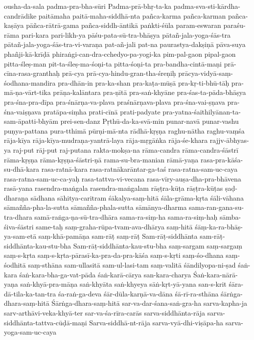 {ousha-da-sala
padma-pra-bha-sūri
Padma-prā-bhṛ-ta-ka
padma-sva-sti-kārdha-candrādike
paitāmaha
paitā-maha-siddhā-nta
pañca-karma
pañca-karman
pañca-kaṣāya
pāñca-rātrā-gama
pañca-siddh-āntikā
paṅkti-śūla
param-eswaran
paraśu-rāma
pari-kara
pari-likh-ya
pāśu-pata-sū-tra-bhāṣya
pātañ-jala-yoga-śās-tra
pātañ-jala-yoga-śās-tra-vi-varaṇa
pat-añ-jali
pat-na
paurastya-dakṣiṇā
pāva-suya
phañji-kā-krīḍā
phiraṅgi-can-dra-cchedyo-pa-yogi-ka
pim-pal-gaon
pipal-gaon
pitta-śleṣ-man
pit-ta-śleṣ-ma-śoṇi-ta
pitta-śoṇi-ta
pra-bandha-cintā-maṇi
prā-cīna-rasa-granthaḥ
prā-cya
prā-cya-hindu-gran-tha-śreṇiḥ
prācya-vidyā-saṃ-śodhana-mandira
pra-dhān-in
pra-ka-shan
pra-kaṭa-mūṣā
pra-kṛ-ti-bhū-tāḥ
pra-mā-ṇa-vārt-tika
prāṇa-kalāntara
pra-ṇītā
pra-saṅ-khyāne
pra-śas-ta-pāda-bhāṣya
pra-śna-pra-dīpa
pra-śnārṇa-va-plava
praśnārṇava-plava
pra-śna-vai-ṣṇava
pra-śna-vaiṣṇava
pratāpa-siṃha
prati-cīnā
prati-padyate
pra-yatna-śaithilyānan-ta-sam-āpatti-bhyām
prei-sen-danz
Pṛthū-da-ka-svā-min
punar-navā
punar-vashu
puṇya-pattana
pura-tthimā
pūrṇi-mā-nta
rādhā-kṛṣṇa
raghu-nātha
raghu-vaṃśa
rāja-kīya
rāja-kīya-mudraṇa-yantrā-laya
rāja-mṛgāṅka
rāja-śe-khara
rajjv-ābhyas-ya
raj-put
rāj-put
raj-putana
rakta-mokṣa-na
rāma-candra
rāma-candra-śāstrī
rāma-kṛṣṇa
rāma-kṛṣṇa-śāstri-ṇā
rama-su-bra-manian
rāmā-yaṇa
rasa-pra-kāśa-su-dhā-kara
rasa-ratnā-kara
rasa-ratnākarāntar-ga-taś
rasa-ratna-sam-uc-caya
rasa-ratna-sam-uc-ca-yaḥ
rasa-tattva-vi-vecana
rasa-vīry-auṣa-dha-pra-bhāvena
rasā-yana
rasendra-maṅgala
rasendra-maṅgalam
rāṣṭra-kūṭa
rāṣṭra-kūṭas
ṣaḍ-dharaṇa
sādhana
sāhitya-caritram 
śākalya-saṃ-hitā
śāla-grāma-kṛta
śāli-vāhana
sāmañña-pha-la-sutta
sāmañña-phala-sutta
sāmānya-dharma
sama-ran-gana-su-tra-dhara
samā-raṅga-ṇa-sū-tra-dhāra
sama-ra-siṃ-ha
sama-ra-siṃ-haḥ
sāmba-śiva-śāstri
same-taḥ
saṃ-graha-rūpa-tvam-ava-dhārya
saṃ-hitā
śāṃ-ka-ra-bhāṣ-ya-sam-etā
saṃ-khā-pamāṇa
sam-rāṭ
saṃ-rāṭ
Sam-rāṭ-siddhānta
sam-rāṭ-siddhānta-kau-stu-bha
Sam-rāṭ-siddhānta-kau-stu-bha
saṃ-sargam
saṃ-sargaṃ
saṃ-s-kṛta
saṃ-s-kṛta-pārasī-ka-pra-da-pra-kāśa
saṃ-s-kṛti 
saṃ-śo-dhana
saṃ-śodhitā
saṃ-sthāna
sam-ullasitā
sam-ul-lasi-tam
saṃ-valitā
śāndilyopa-ni-ṣad
śaṅ-kara
śaṅ-kara-bha-ga-vat-pāda
śaṅ-karā-cārya
san-kara-charya
Śaṅ-kara-nārā-yaṇa
saṅ-khyā-pra-māṇa
saṅ-khyāta
saṅ-khyeya
sāṅ-kṛt-yā-yana
san-s-krit
śāra-dā-tila-ka-tan-tra
śa-raṅ-ga-deva
śār-dūla-karṇā-va-dāna
śā-rī-ra-sthāna
śārṅga-dhara-saṃ-hitā
Śārṅga-dhara-saṃ-hitā
sar-va-dar-śana-saṅ-gra-ha
sarva-kapha-ja
sarv-arthāvi-veka-khyā-ter
sar-va-śa-rīra-carās
sarva-siddhānta-rāja
sarva-siddhānta-tattva-cūḍā-maṇi
Sarva-siddhā-nt-rāja
sarva-vyā-dhi-viṣāpa-ha
sarva-yoga-sam-uc-caya
}
